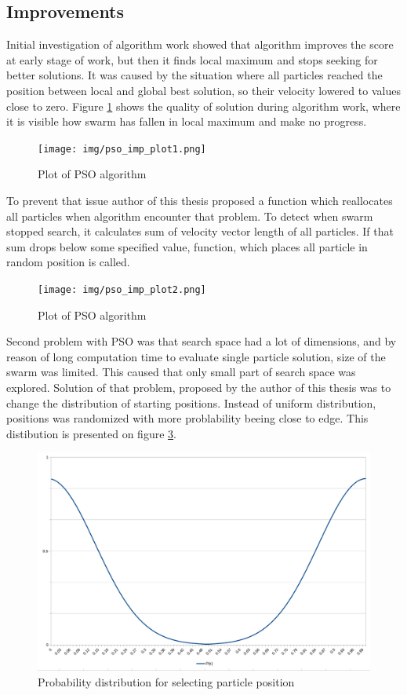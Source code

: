 \subsection{Improvements}
Initial investigation of algorithm work showed that algorithm improves the score at early stage of work, but then it finds local maximum 
and stops seeking for better solutions. It was caused by the situation where all particles reached the position between 
local and global best solution, so their velocity lowered to values close to zero. Figure \ref{img_pso_imp_plot1} shows the quality of solution 
during algorithm work, where it is visible how swarm has fallen in local maximum and make no progress.
\begin{figure}[ht]
\centering
	\texttt{[image: img/pso\_imp\_plot1.png]}
	\caption{Plot of PSO algorithm }
	\label{img_pso_imp_plot1}
\end{figure}

To prevent that issue author of this thesis proposed a function which reallocates all particles when algorithm encounter that problem. 
To detect when swarm stopped search, it calculates sum of velocity vector length of all particles. 
If that sum drops below some specified value, function, which places all particle in random position is called. 
\begin{figure}[ht]
	\centering
	\texttt{[image: img/pso\_imp\_plot2.png]}
	\caption{Plot of PSO algorithm }
	\label{img_pso_imp_plot2}
\end{figure}

Second problem with PSO was that search space had a lot of dimensions, and by reason of long computation time to evaluate single particle solution, 
size of the swarm was limited. This caused that only small part of search space was explored. Solution of that problem, 
proposed by the author of this thesis was to change the distribution of starting positions. Instead of uniform distribution, positions was randomized 
with more problability beeing close to edge. This distibution is presented on figure \ref{img_pso_imp_dist}.

\begin{figure}[ht]
	\centering
	\includegraphics[scale=0.4]{img/pso_dist.png}
	\caption{Probability distribution for selecting particle position}
	\label{img_pso_imp_dist}
\end{figure}

